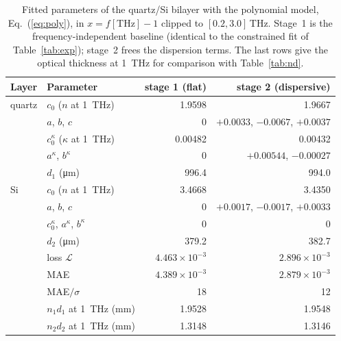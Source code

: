 \documentclass{optica-article}
\newcommand{\kap}{\kappa}
\newcommand{\Lt}{\mathcal{L}}
\begin{document}
\begin{table}[htb]\centering\small
  \caption{Fitted parameters of the quartz/Si bilayer with the polynomial model, Eq.~(\ref{eq:poly}), in $x=f[\mathrm{THz}]-1$ clipped to $[0.2,3.0]$\,THz. Stage~1 is the frequency-independent baseline (identical to the constrained fit of Table~\ref{tab:exp}); stage~2 frees the dispersion terms. The last rows give the optical thickness at \SI{1}{THz} for comparison with Table~\ref{tab:nd}.}
  \label{tab:disp}
  \begin{tabular}{l l r r}\toprule
    Layer & Parameter & stage 1 (flat) & stage 2 (dispersive)\\\midrule
    quartz & $c_0$ ($n$ at \SI{1}{THz}) & 1.9598 & 1.9667\\
           & $a$, $b$, $c$ & 0 & $+0.0033$, $-0.0067$, $+0.0037$\\
           & $c_0^\kap$ ($\kap$ at \SI{1}{THz}) & 0.00482 & 0.00432\\
           & $a^\kap$, $b^\kap$ & 0 & $+0.00544$, $-0.00027$\\
           & $d_1$ (\si{\micro\metre}) & 996.4 & 994.0\\\midrule
    Si     & $c_0$ ($n$ at \SI{1}{THz}) & 3.4668 & 3.4350\\
           & $a$, $b$, $c$ & 0 & $+0.0017$, $-0.0017$, $+0.0033$\\
           & $c_0^\kap$, $a^\kap$, $b^\kap$ & 0 & 0\\
           & $d_2$ (\si{\micro\metre}) & 379.2 & 382.7\\\midrule
           & loss $\Lt$ & $4.463\times10^{-3}$ & $2.896\times10^{-3}$\\
           & MAE & $4.389\times10^{-3}$ & $2.879\times10^{-3}$\\
           & MAE$/\sigma$ & 18 & 12\\\midrule
           & $n_1d_1$ at \SI{1}{THz} (\si{\milli\metre}) & 1.9528 & 1.9548\\
           & $n_2d_2$ at \SI{1}{THz} (\si{\milli\metre}) & 1.3148 & 1.3146\\
    \bottomrule
  \end{tabular}
\end{table}
\end{document}
